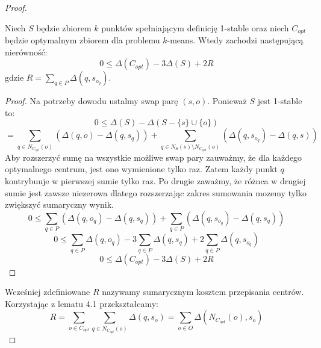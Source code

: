 \begin{proof}
    \begin{lemma}{\cite{Arya2004LocalSH}}
        Niech $S$ będzie zbiorem $k$ punktów spełniającym definicję 1-stable oraz niech $C_{opt}$ będzie optymalnym zbiorem dla problemu $k$-means.        Wtedy zachodzi następującą nierówność:
        \begin{equation}
            0 \leq \Delta(C_{opt}) - 3\Delta(S) + 2R
        \end{equation}
        gdzie $R = \sum_{q \in P} \Delta(q, s_{o_{q}})$.
    \end{lemma}
    \begin{proof}
        Na potrzeby dowodu ustalmy swap parę $(s, o)$.
        Ponieważ $S$ jest 1-stable to:
        \begin{equation}
           0 \leq \Delta(S) -  \Delta(S - \{s\} \cup \{o\})
        \end{equation}
        \begin{equation}
            = \sum_{q \in N_{C_{opt}}(o)} (\Delta(q, o) - \Delta(q, s_{q})) + \sum_{q \in N_{S}(s) \setminus N_{C_{opt}}(o)} (\Delta(q, s_{o_{q}}) - \Delta(q, s))
        \end{equation}
        Aby rozszerzyć sumę na wszystkie możliwe swap pary zauważmy, że dla każdego optymalnego centrum, jest ono wymienione tylko raz.
        Zatem każdy punkt $q$ kontrybuuje w pierwszej sumie tylko raz.
        Po drugie zaważmy, że różnca w drugiej sumie jest zawsze niezerowa dlatego rozszerzając zakres sumowania mozemy tylko zwiększyć sumaryczny wynik.
        \begin{equation}
            0 \leq \sum_{q \in P} (\Delta(q, o_{q}) - \Delta(q, s_{q})) + \sum_{q \in P} (\Delta(q, s_{o_{q}}) - \Delta(q, s_{q}))
        \end{equation}
        \begin{equation}
            0 \leq \sum_{q \in P} \Delta(q, o_{q}) - 3 \sum_{q \in P} \Delta(q, s_{q}) + 2\sum_{q \in P} \Delta(q, s_{o_{q}})
        \end{equation}
        \begin{equation}
            0 \leq \Delta(C_{opt}) - 3 \Delta(S) + 2R
        \end{equation}
    \end{proof}
    \noindent
    Wcześniej zdefiniowane $R$ nazywamy sumarycznym kosztem przepisania centrów.
    Korzystając z lematu 4.1 przekształcamy:
    \begin{equation}
        R = \sum_{o \in C_{opt}} \sum_{q \in N_{C_{opt}}(o)} \Delta(q, s_{o}) = \sum_{o \in O} \Delta(N_{C_{opt}}(o), s_{o}) 

\end{equation}
\end{proof}
